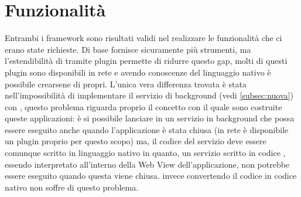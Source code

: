     \section{Funzionalità}
    Entrambi i framework sono risultati validi nel realizzare le
    funzionalità che ci erano state richieste. Di base \tisdk{} fornisce
    sicuramente più strumenti, ma l'estendibilità di \pg{} tramite plugin
    permette di ridurre questo gap, molti di questi plugin sono
    disponibili in rete e avendo conoscenze del linguaggio nativo è
    possibile crearsene di propri. L'unica vera differenza
    trovata è stata nell'impossibilità di implementare il servizio di
    background (vedi \ref{subsec:nuova}) con \pg{}, questo problema
    riguarda proprio il concetto con
    il quale sono costruite queste applicazioni: è si possibile lanciare
    in \js{}
    un servizio in background che possa essere eseguito anche quando
    l'applicazione è stata chiusa (in rete è disponibile un plugin proprio
    per questo scopo) ma, il codice del servizio deve essere comunque
    scritto in linguaggio nativo in quanto, un servizio scritto in codice
    \js{}, essendo interpretato all'interno della Web View
    dell'applicazione, non potrebbe essere eseguito quando questa viene
    chiusa.
    \tisdk{} invece convertendo il codice \js{} in codice nativo non
    soffre di questo problema.


